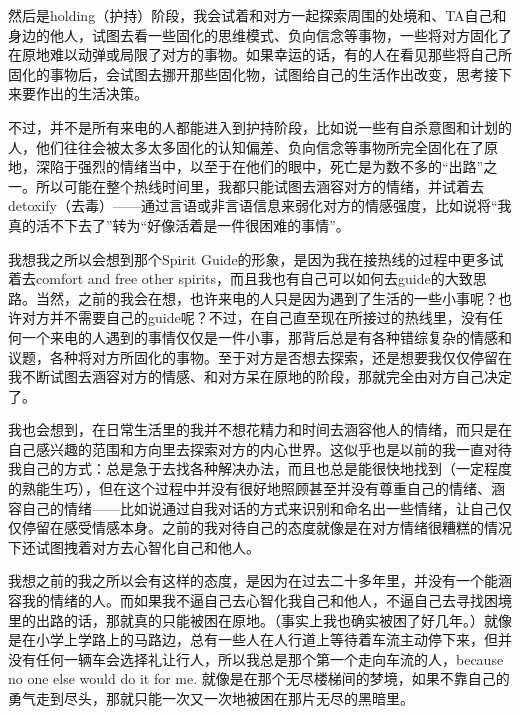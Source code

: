 然后是holding（护持）阶段，我会试着和对方一起探索周围的处境和、TA自己和身边的他人，试图去看一些固化的思维模式、负向信念等事物，一些将对方固化了在原地难以动弹或局限了对方的事物。如果幸运的话，有的人在看见那些将自己所固化的事物后，会试图去挪开那些固化物，试图给自己的生活作出改变，思考接下来要作出的生活决策。

不过，并不是所有来电的人都能进入到护持阶段，比如说一些有自杀意图和计划的人，他们往往会被太多太多固化的认知偏差、负向信念等事物所完全固化在了原地，深陷于强烈的情绪当中，以至于在他们的眼中，死亡是为数不多的“出路”之一。所以可能在整个热线时间里，我都只能试图去涵容对方的情绪，并试着去detoxify（去毒）——通过言语或非言语信息来弱化对方的情感强度，比如说将“我真的活不下去了”转为“好像活着是一件很困难的事情”。

我想我之所以会想到那个Spirit Guide的形象，是因为我在接热线的过程中更多试着去comfort and free other spirits，而且我也有自己可以如何去guide的大致思路。当然，之前的我会在想，也许来电的人只是因为遇到了生活的一些小事呢？也许对方并不需要自己的guide呢？不过，在自己直至现在所接过的热线里，没有任何一个来电的人遇到的事情仅仅是一件小事，那背后总是有各种错综复杂的情感和议题，各种将对方所固化的事物。至于对方是否想去探索，还是想要我仅仅停留在我不断试图去涵容对方的情感、和对方呆在原地的阶段，那就完全由对方自己决定了。

我也会想到，在日常生活里的我并不想花精力和时间去涵容他人的情绪，而只是在自己感兴趣的范围和方向里去探索对方的内心世界。这似乎也是以前的我一直对待我自己的方式：总是急于去找各种解决办法，而且也总是能很快地找到（一定程度的熟能生巧），但在这个过程中并没有很好地照顾甚至并没有尊重自己的情绪、涵容自己的情绪——比如说通过自我对话的方式来识别和命名出一些情绪，让自己仅仅停留在感受情感本身。之前的我对待自己的态度就像是在对方情绪很糟糕的情况下还试图拽着对方去心智化自己和他人。

我想之前的我之所以会有这样的态度，是因为在过去二十多年里，并没有一个能涵容我的情绪的人。而如果我不逼自己去心智化我自己和他人，不逼自己去寻找困境里的出路的话，那就真的只能被困在原地。（事实上我也确实被困了好几年。）就像是在小学上学路上的马路边，总有一些人在人行道上等待着车流主动停下来，但并没有任何一辆车会选择礼让行人，所以我总是那个第一个走向车流的人，because no one else would do it for me. 就像是在那个无尽楼梯间的梦境，如果不靠自己的勇气走到尽头，那就只能一次又一次地被困在那片无尽的黑暗里。
